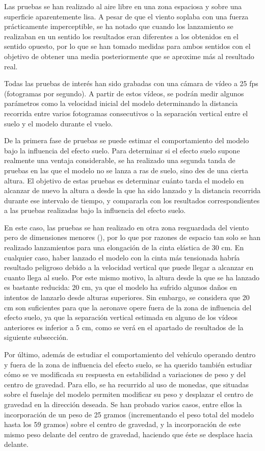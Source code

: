 Las pruebas se han realizado al aire libre en una zona espaciosa y sobre una superficie aparentemente lisa. A pesar de que el viento soplaba con una fuerza prácticamente imperceptible, se ha notado que cuando los lanzamiento se realizaban en un sentido los resultados eran diferentes a los obtenidos en el sentido opuesto, por lo que se han tomado medidas para ambos sentidos con el objetivo de obtener una media posteriormente que se aproxime más al resultado real.

Todas las pruebas de interés han sido grabadas con una cámara de vídeo a 25 fps (fotogramas por segundo). A partir de estos vídeos, se podrán medir algunos parámetros como la velocidad inicial del modelo determinando la distancia recorrida entre varios fotogramas consecutivos o la separación vertical entre el suelo y el modelo durante el vuelo.

De la primera fase de pruebas se puede estimar el comportamiento del modelo bajo la influencia del efecto suelo. Para determinar si el efecto suelo supone realmente una ventaja considerable, se ha realizado una segunda tanda de pruebas en las que el modelo no se lanza a ras de suelo, sino des de una cierta altura. El objetivo de estas pruebas es determinar cuánto tarda el modelo en alcanzar de nuevo la altura a desde la que ha sido lanzado y la distancia recorrida durante ese intervalo de tiempo, y compararla con los resultados correspondientes a las pruebas realizadas bajo la influencia del efecto suelo.

En este caso, las pruebas se han realizado en otra zona resguardada del viento pero de dimensiones menores (), por lo que por razones de espacio tan solo se han realizado lanzamientos para una elongación de la cinta elástica de 30 cm. En cualquier caso, haber lanzado el modelo con la cinta más tensionada habría resultado peligroso debido a la velocidad vertical que puede llegar a alcanzar en cuanto llega al suelo. Por este mismo motivo, la altura desde la que se ha lanzado es bastante reducida: 20 cm, ya que el modelo ha sufrido algunos daños en intentos de lanzarlo desde alturas superiores. Sin embargo, se considera que 20 cm son suficientes para que la aeronave opere fuera de la zona de influencia del efecto suelo, ya que la separación vertical estimada en alguno de los vídeos anteriores es inferior a 5 cm, como se verá en el apartado de resultados de la siguiente subsección.

Por último, además de estudiar el comportamiento del vehículo operando dentro y fuera de la zona de influencia del efecto suelo, se ha querido también estudiar cómo se ve modificada su respuesta en estabilidad a variaciones de peso y del centro de gravedad. Para ello, se ha recurrido al uso de monedas, que situadas sobre el fuselaje del modelo permiten modificar su peso y desplazar el centro de gravedad en la dirección deseada. Se han probado varios casos, entre ellos la incorporación de un peso de 25 gramos (incrementando el peso total del modelo hasta los 59 gramos) sobre el centro de gravedad, y la incorporación de este mismo peso delante del centro de gravedad, haciendo que éste se desplace hacia delante.

